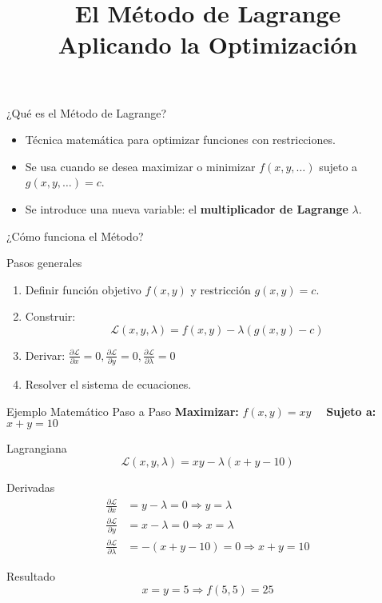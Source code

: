 \documentclass{beamer}
\title{\textbf{El Método de Lagrange} \\ \large Aplicando la Optimización}
\author{}
\date{}
\begin{document}
	
	\begin{frame}
		\titlepage
	\end{frame}
	
	\begin{frame}{¿Qué es el Método de Lagrange?}
		\begin{itemize}
			\item Técnica matemática para optimizar funciones con restricciones.
			\item Se usa cuando se desea maximizar o minimizar \( f(x, y, \dots) \) sujeto a \( g(x, y, \dots) = c \).
			\item Se introduce una nueva variable: el \textbf{multiplicador de Lagrange} \( \lambda \).
		\end{itemize}
	\end{frame}
	
	\begin{frame}{¿Cómo funciona el Método?}
		\begin{block}{Pasos generales}
			\begin{enumerate}
				\item Definir función objetivo \( f(x, y) \) y restricción \( g(x, y) = c \).
				\item Construir:
				\[
				\mathcal{L}(x, y, \lambda) = f(x, y) - \lambda (g(x, y) - c)
				\]
				\item Derivar: \( \frac{\partial \mathcal{L}}{\partial x} = 0, \frac{\partial \mathcal{L}}{\partial y} = 0, \frac{\partial \mathcal{L}}{\partial \lambda} = 0 \)
				\item Resolver el sistema de ecuaciones.
			\end{enumerate}
		\end{block}
	\end{frame}
	
	\begin{frame}{Ejemplo Matemático Paso a Paso}
		\textbf{Maximizar:} \( f(x, y) = xy \quad \) \textbf{Sujeto a:} \( x + y = 10 \)
		
		\vspace{0.5em}
		\begin{block}{Lagrangiana}
			\[
			\mathcal{L}(x, y, \lambda) = xy - \lambda(x + y - 10)
			\]
		\end{block}
		
		\begin{block}{Derivadas}
			\begin{align*}
				\frac{\partial \mathcal{L}}{\partial x} &= y - \lambda = 0 \Rightarrow y = \lambda \\
				\frac{\partial \mathcal{L}}{\partial y} &= x - \lambda = 0 \Rightarrow x = \lambda \\
				\frac{\partial \mathcal{L}}{\partial \lambda} &= -(x + y - 10) = 0 \Rightarrow x + y = 10
			\end{align*}
		\end{block}
		
		\begin{block}{Resultado}
			\[
			x = y = 5 \Rightarrow f(5,5) = 25
			\]
		\end{block}
	\end{frame}
	
\end{document}
